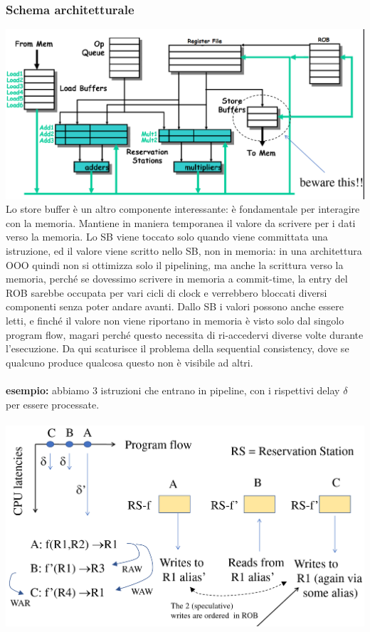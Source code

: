 \documentclass[14pt, oneside]{book}
\begin{document}
\subsubsection{Schema architetturale}
\includegraphics[scale=0.25]{immagini/arch-moderna}\\
Lo store buffer è un altro componente interessante: è fondamentale per interagire con la memoria. Mantiene in maniera temporanea il valore da scrivere per i dati verso la memoria. Lo SB viene toccato solo quando viene committata una istruzione, ed il valore viene scritto nello SB, non in memoria: in una architettura OOO quindi non si ottimizza solo il pipelining, ma anche la scrittura verso la memoria, perché se dovessimo scrivere in memoria a commit-time, la entry del ROB sarebbe occupata per vari cicli di clock e verrebbero bloccati diversi componenti senza poter andare avanti. Dallo SB i valori possono anche essere letti, e finché il valore non viene riportano in memoria è visto solo dal singolo program flow, magari perché questo necessita di ri-accedervi diverse volte durante l'esecuzione. Da qui scaturisce il problema della sequential consistency, dove se qualcuno produce qualcosa questo non è visibile ad altri.\\\\ \textbf{esempio:} abbiamo 3 istruzioni che entrano in pipeline, con i rispettivi delay $\delta$ per essere processate.
\\\\
\includegraphics[scale=0.25]{immagini/ex-pipeline}
\end{document}
